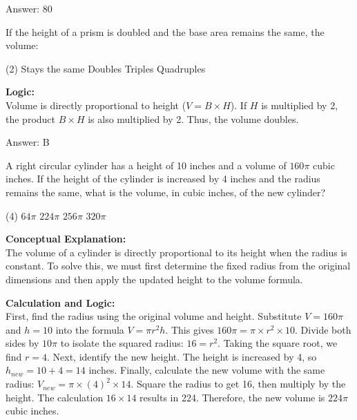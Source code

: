 \documentclass[11pt,paper=a4,answers]{exam}
\begin{document}
\begin{questions}
\begin{solution}
\vspace{30pt}

Answer: \colorbox{yellow!100}{80}
\end{solution}

\vspace{60pt}

\question
If the height of a prism is doubled and the base area remains the same, the volume:
\begin{tasks}(2)
    \task Stays the same
    \task Doubles
    \task Triples
    \task Quadruples
\end{tasks}

\begin{solution}
\textbf{Logic:} \\
Volume is directly proportional to height ($V = B \times H$). If $H$ is multiplied by 2, the product $B \times H$ is also multiplied by 2. Thus, the volume doubles.

\vspace{30pt}

Answer: \colorbox{yellow!100}{B}
\end{solution}

\vspace{60pt}


\question
A right circular cylinder has a height of 10 inches and a volume of $160\pi$ cubic inches. If the height of the cylinder is increased by 4 inches and the radius remains the same, what is the volume, in cubic inches, of the new cylinder?
\begin{tasks}(4)
    \task $64\pi$
    \task $224\pi$
    \task $256\pi$
    \task $320\pi$
\end{tasks}

\begin{solution}
\textbf{Conceptual Explanation:} \\
The volume of a cylinder is directly proportional to its height when the radius is constant. To solve this, we must first determine the fixed radius from the original dimensions and then apply the updated height to the volume formula.

\vspace{30pt}

\textbf{Calculation and Logic:} \\
First, find the radius using the original volume and height. Substitute $V = 160\pi$ and $h = 10$ into the formula $V = \pi r^2 h$. This gives $160\pi = \pi \times r^2 \times 10$. Divide both sides by $10\pi$ to isolate the squared radius: $16 = r^2$. Taking the square root, we find $r = 4$. Next, identify the new height. The height is increased by 4, so $h_{new} = 10 + 4 = 14$ inches. Finally, calculate the new volume with the same radius: $V_{new} = \pi \times (4)^2 \times 14$. Square the radius to get 16, then multiply by the height. The calculation $16 \times 14$ results in 224. Therefore, the new volume is $224\pi$ cubic inches.


\end{solution}
\end{questions}
\end{document}
